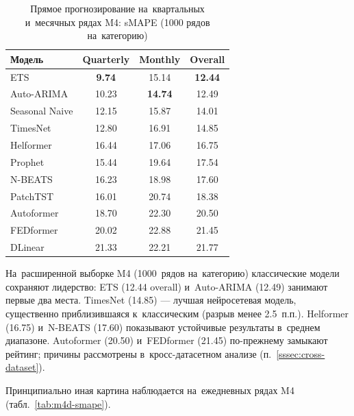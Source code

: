 \begin{table}[H]
\centering
\caption{Прямое прогнозирование на~квартальных и~месячных рядах M4: sMAPE (1000 рядов на~категорию)}
\label{tab:m4qm-smape}
\small
\begin{tabular}{@{}lccc@{}}
\toprule
Модель & Quarterly & Monthly & Overall \\
\midrule
ETS            & \textbf{9.74}  & 15.14 & \textbf{12.44} \\
Auto-ARIMA     & 10.23 & \textbf{14.74} & 12.49 \\
Seasonal Naive & 12.15 & 15.87 & 14.01 \\
TimesNet       & 12.80 & 16.91 & 14.85 \\
\midrule
Helformer      & 16.44 & 17.06 & 16.75 \\
Prophet        & 15.44 & 19.64 & 17.54 \\
N-BEATS        & 16.23 & 18.98 & 17.60 \\
PatchTST       & 16.01 & 20.74 & 18.38 \\
\midrule
Autoformer     & 18.70 & 22.30 & 20.50 \\
FEDformer      & 20.02 & 22.88 & 21.45 \\
DLinear        & 21.33 & 22.21 & 21.77 \\
\bottomrule
\end{tabular}
\end{table}

На~расширенной выборке M4 (1000~рядов на~категорию) классические модели
сохраняют лидерство: ETS (12.44 overall) и~Auto-ARIMA (12.49) занимают
первые два места. TimesNet (14.85) --- лучшая нейросетевая модель,
существенно приблизившаяся к~классическим (разрыв менее 2.5~п.п.).
Helformer (16.75) и~N-BEATS (17.60) показывают устойчивые результаты
в~среднем диапазоне. Autoformer (20.50) и~FEDformer (21.45) по-прежнему
замыкают рейтинг; причины рассмотрены
в~кросс-датасетном анализе (п.~\ref{sssec:cross-dataset}).

Принципиально иная картина наблюдается на~ежедневных рядах M4
(табл.~\ref{tab:m4d-smape}).

